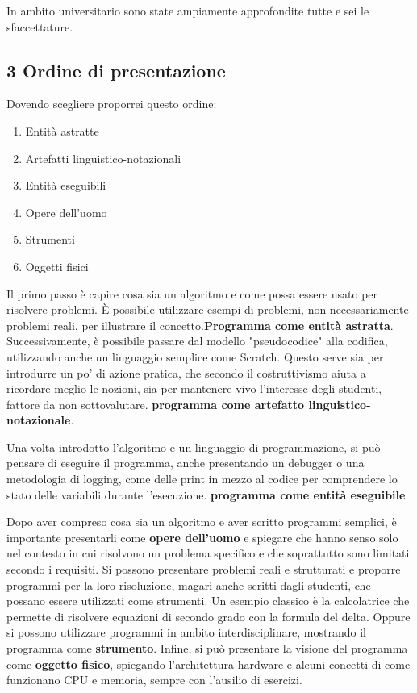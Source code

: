\documentclass[a4paper]{article}
\begin{document}
In ambito universitario sono state ampiamente approfondite tutte e sei le sfaccettature.
\subsection{3 Ordine di presentazione}
Dovendo scegliere proporrei questo ordine:
\begin{enumerate}
	\item Entità astratte
	\item Artefatti linguistico-notazionali
	\item Entità eseguibili
	\item Opere dell'uomo
	\item Strumenti
	\item Oggetti fisici
\end{enumerate}
Il primo passo è capire cosa sia un algoritmo e come possa essere usato per risolvere problemi. È possibile utilizzare esempi di problemi, non necessariamente problemi reali, per illustrare il concetto.\textbf{Programma come entità astratta}.
Successivamente, è possibile passare dal modello "pseudocodice" alla codifica, utilizzando anche un linguaggio semplice come Scratch. Questo serve sia per introdurre un po' di azione pratica, che secondo il costruttivismo aiuta a ricordare meglio le nozioni, sia per mantenere vivo l'interesse degli studenti, fattore da non sottovalutare. \textbf{programma come artefatto linguistico-notazionale}.

Una volta introdotto l'algoritmo e un linguaggio di programmazione, si può pensare di eseguire il programma, anche presentando un debugger o una metodologia di logging, come delle print in mezzo al codice per comprendere lo stato delle variabili durante l'esecuzione. \textbf{programma come entità eseguibile}

Dopo aver compreso cosa sia un algoritmo e aver scritto programmi semplici, è importante presentarli come \textbf{opere dell'uomo} e spiegare che hanno senso solo nel contesto in cui risolvono un problema specifico e che soprattutto sono limitati secondo i requisiti.
Si possono presentare problemi reali e strutturati e proporre programmi per la loro risoluzione, magari anche scritti dagli studenti, che possano essere utilizzati come strumenti. 
Un esempio classico è la calcolatrice che permette di risolvere equazioni di secondo grado con la formula del delta. Oppure si possono utilizzare programmi in ambito interdisciplinare, mostrando il programma come \textbf{strumento}.
Infine, si può presentare la visione del programma come \textbf{oggetto fisico}, spiegando l'architettura hardware e alcuni concetti di come funzionano CPU e memoria, sempre con l'ausilio di esercizi. 
\end{document}
